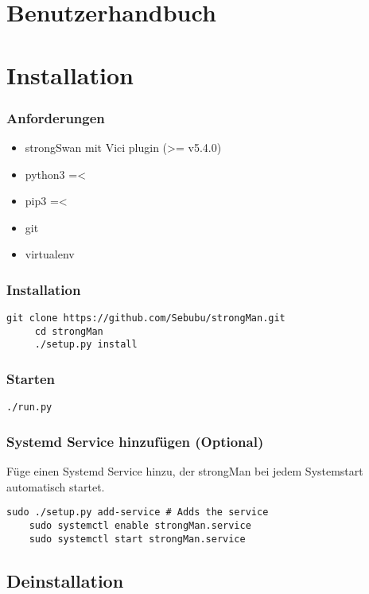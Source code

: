 \section{Benutzerhandbuch}

\section{Installation}
\subsubsection{Anforderungen}
\begin{itemize}
	\item strongSwan mit Vici plugin (>= v5.4.0)
	\item python3 =<
	\item pip3 =<
	\item git
	\item virtualenv
\end{itemize}
\subsubsection{Installation}
\begin{lstlisting}[style=BashInputStyle]
	 git clone https://github.com/Sebubu/strongMan.git
	 cd strongMan
	 ./setup.py install
\end{lstlisting}

\subsubsection{Starten}
\begin{lstlisting}[style=BashInputStyle]
	 ./run.py
\end{lstlisting}

\subsubsection{Systemd Service hinzufügen (Optional)}
Füge einen Systemd Service hinzu, der strongMan bei jedem Systemstart automatisch startet.
\begin{lstlisting}[style=BashInputStyle]
    sudo ./setup.py add-service # Adds the service
    sudo systemctl enable strongMan.service
    sudo systemctl start strongMan.service
\end{lstlisting}

\subsection{Deinstallation}
